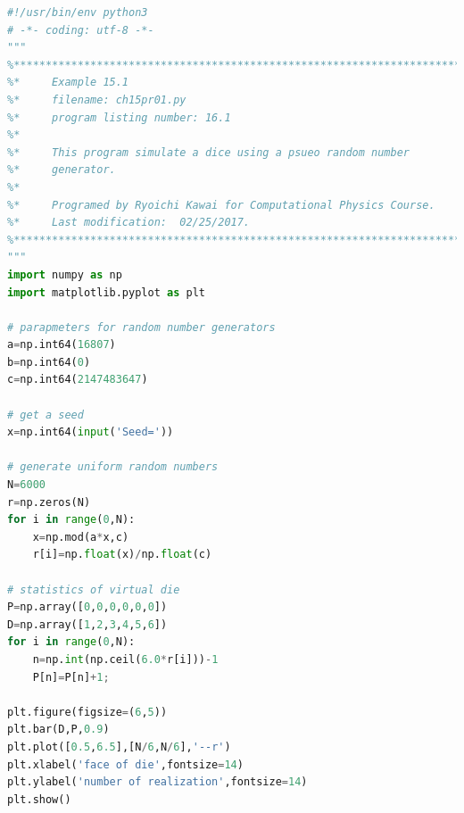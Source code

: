 \bigskip
\noindent
\program
\footnotesize
\begin{lstlisting}[language=python]
#!/usr/bin/env python3
# -*- coding: utf-8 -*-
"""
%**************************************************************************
%*     Example 15.1                                                       *
%*     filename: ch15pr01.py                                              *
%*     program listing number: 16.1                                       *
%*                                                                        *
%*     This program simulate a dice using a psueo random number           *
%*     generator.                                                         *
%*                                                                        *
%*     Programed by Ryoichi Kawai for Computational Physics Course.       *
%*     Last modification:  02/25/2017.                                    *
%**************************************************************************
"""
import numpy as np
import matplotlib.pyplot as plt

# parapmeters for random number generators
a=np.int64(16807)
b=np.int64(0) 
c=np.int64(2147483647)

# get a seed
x=np.int64(input('Seed='))

# generate uniform random numbers
N=6000
r=np.zeros(N)
for i in range(0,N):
    x=np.mod(a*x,c)
    r[i]=np.float(x)/np.float(c)
 
# statistics of virtual die
P=np.array([0,0,0,0,0,0])
D=np.array([1,2,3,4,5,6])
for i in range(0,N):
    n=np.int(np.ceil(6.0*r[i]))-1
    P[n]=P[n]+1;

plt.figure(figsize=(6,5))
plt.bar(D,P,0.9)
plt.plot([0.5,6.5],[N/6,N/6],'--r')
plt.xlabel('face of die',fontsize=14)
plt.ylabel('number of realization',fontsize=14)
plt.show()
\end{lstlisting}
\normalsize

